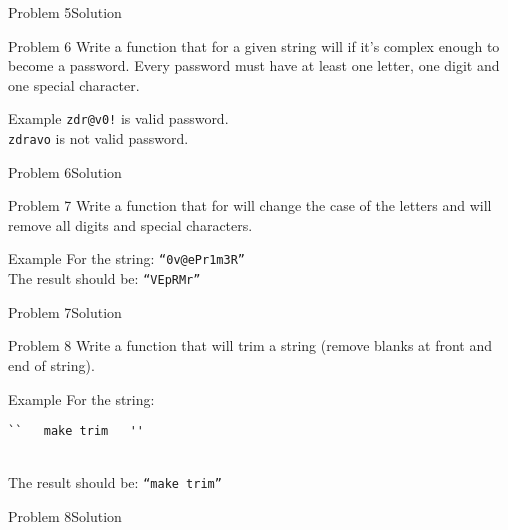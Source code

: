 \begin{frame}[fragile]{Problem 5}{Solution}

\end{frame}

\begin{frame}{Problem 6}
Write a function that for a given string will if it's complex enough to become a
password. Every password must have at least one letter, one digit and one
special character.
\begin{exampleblock}{Example}
\texttt{zdr@v0!} is valid password.\\
\texttt{zdravo} is not valid password.
\end{exampleblock}
\end{frame}

\begin{frame}[fragile]{Problem 6}{Solution}

\end{frame}

\begin{frame}{Problem 7}
Write a function that for will change the case of the letters and will remove
all digits and special characters.

\begin{exampleblock}{Example}
For the string: \texttt{``0v@ePr1m3R''} \\
The result should be: \texttt{``VEpRMr''} 
\end{exampleblock}
\end{frame}

\begin{frame}[fragile]{Problem 7}{Solution}

\end{frame}

\begin{frame}[fragile]{Problem 8}
Write a function that will trim a string (remove blanks at front and end of
string).
\begin{exampleblock}{Example}
For the string: \begin{verbatim}``   make trim   ''\end{verbatim} \\
The result should be: \texttt{``make trim''} 
\end{exampleblock}
\end{frame}

\begin{frame}[fragile]{Problem 8}{Solution}

\end{frame}
